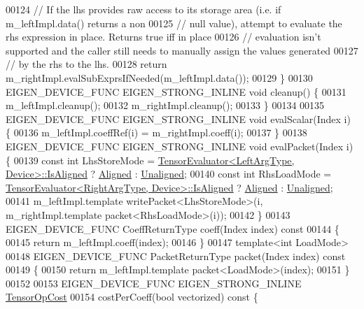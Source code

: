 \begin{DoxyCode}
00124     \textcolor{comment}{// If the lhs provides raw access to its storage area (i.e. if m\_leftImpl.data() returns a non}
00125     \textcolor{comment}{// null value), attempt to evaluate the rhs expression in place. Returns true iff in place}
00126     \textcolor{comment}{// evaluation isn't supported and the caller still needs to manually assign the values generated}
00127     \textcolor{comment}{// by the rhs to the lhs.}
00128     \textcolor{keywordflow}{return} m\_rightImpl.evalSubExprsIfNeeded(m\_leftImpl.data());
00129   \}
00130   EIGEN\_DEVICE\_FUNC EIGEN\_STRONG\_INLINE \textcolor{keywordtype}{void} cleanup() \{
00131     m\_leftImpl.cleanup();
00132     m\_rightImpl.cleanup();
00133   \}
00134 
00135   EIGEN\_DEVICE\_FUNC EIGEN\_STRONG\_INLINE \textcolor{keywordtype}{void} evalScalar(Index i) \{
00136     m\_leftImpl.coeffRef(i) = m\_rightImpl.coeff(i);
00137   \}
00138   EIGEN\_DEVICE\_FUNC EIGEN\_STRONG\_INLINE \textcolor{keywordtype}{void} evalPacket(Index i) \{
00139     \textcolor{keyword}{const} \textcolor{keywordtype}{int} LhsStoreMode = \hyperlink{struct_eigen_1_1_tensor_evaluator}{TensorEvaluator<LeftArgType, Device>::IsAligned}
       ? \hyperlink{group__enums_gga45fe06e29902b7a2773de05ba27b47a1ad37d4c71425bb286e9b4103830538fbf}{Aligned} : \hyperlink{group__enums_gga45fe06e29902b7a2773de05ba27b47a1ac935220b4c844108e183ebe30a4d5204}{Unaligned};
00140     \textcolor{keyword}{const} \textcolor{keywordtype}{int} RhsLoadMode = \hyperlink{struct_eigen_1_1_tensor_evaluator}{TensorEvaluator<RightArgType, Device>::IsAligned}
       ? \hyperlink{group__enums_gga45fe06e29902b7a2773de05ba27b47a1ad37d4c71425bb286e9b4103830538fbf}{Aligned} : \hyperlink{group__enums_gga45fe06e29902b7a2773de05ba27b47a1ac935220b4c844108e183ebe30a4d5204}{Unaligned};
00141     m\_leftImpl.template writePacket<LhsStoreMode>(i, m\_rightImpl.template packet<RhsLoadMode>(i));
00142   \}
00143   EIGEN\_DEVICE\_FUNC CoeffReturnType coeff(Index index)\textcolor{keyword}{ const}
00144 \textcolor{keyword}{  }\{
00145     \textcolor{keywordflow}{return} m\_leftImpl.coeff(index);
00146   \}
00147   \textcolor{keyword}{template}<\textcolor{keywordtype}{int} LoadMode>
00148   EIGEN\_DEVICE\_FUNC PacketReturnType packet(Index index)\textcolor{keyword}{ const}
00149 \textcolor{keyword}{  }\{
00150     \textcolor{keywordflow}{return} m\_leftImpl.template packet<LoadMode>(index);
00151   \}
00152 
00153   EIGEN\_DEVICE\_FUNC EIGEN\_STRONG\_INLINE \hyperlink{class_eigen_1_1_tensor_op_cost}{TensorOpCost}
00154   costPerCoeff(\textcolor{keywordtype}{bool} vectorized)\textcolor{keyword}{ const }\{

\end{DoxyCode}
